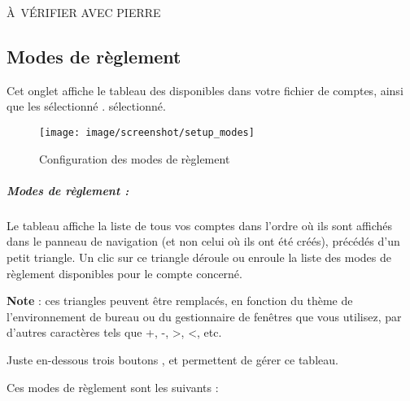 À VÉRIFIER AVEC PIERRE

\subsection{Modes de règlement\label{setup-resources-modes}}


Cet onglet affiche le tableau des  disponibles dans votre fichier de comptes, ainsi que les 
\ifIllustration sélectionné . 
\else sélectionné.






\fi



\ifIllustration
\begin{figure}[ht]
\begin{center}
\texttt{[image: image/screenshot/setup\_modes]}
\end{center}
\caption{Configuration des modes de règlement}
\label{setup-modes-img}
\end{figure}
\fi

\subparagraph{Modes de règlement :\label{setup-resources-modes-list}}




Le tableau affiche la liste de tous vos comptes dans l'ordre où ils sont affichés dans le panneau de navigation (et non celui où ils ont été créés), précédés d'un petit triangle. Un clic sur ce triangle déroule ou enroule la liste des modes de règlement disponibles pour le compte concerné.

\textbf{Note} : ces triangles peuvent être remplacés, en fonction du thème de l'environnement de bureau ou du gestionnaire de fenêtres que vous utilisez, par d'autres caractères tels que +, -, >, <, etc.

Juste en-dessous trois boutons ,  et   permettent de gérer ce tableau.





Ces modes de règlement sont les suivants : 

